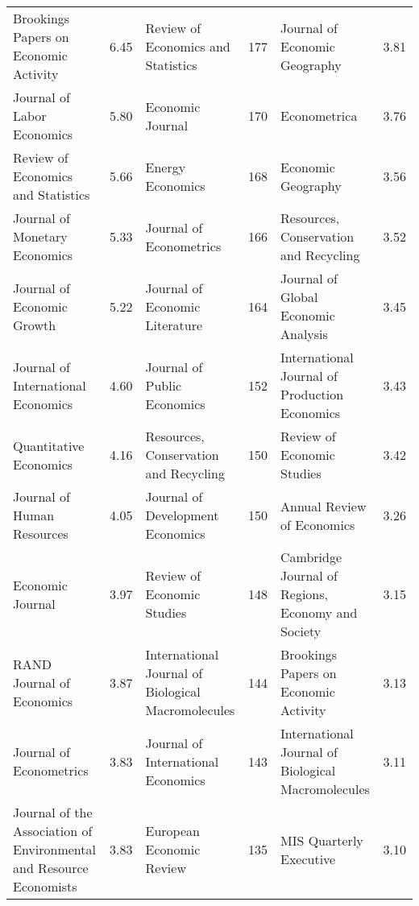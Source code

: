 \begin{table}
\begin{tabularx}{\hsize}{@{}Yr|Yr|Yr@{}}
                              Brookings Papers on Economic Activity &  6.45 &                 Review of Economics and Statistics & 177 &                      Journal of Economic Geography & 3.81 \\
                                         Journal of Labor Economics &  5.80 &                                   Economic Journal & 170 &                                       Econometrica & 3.76 \\
                                 Review of Economics and Statistics &  5.66 &                                   Energy Economics & 168 &                                 Economic Geography & 3.56 \\
                                      Journal of Monetary Economics &  5.33 &                            Journal of Econometrics & 166 &              Resources, Conservation and Recycling & 3.52 \\
                                         Journal of Economic Growth &  5.22 &                     Journal of Economic Literature & 164 &                Journal of Global Economic Analysis & 3.45 \\
                                 Journal of International Economics &  4.60 &                        Journal of Public Economics & 152 &      International Journal of Production Economics & 3.43 \\
                                             Quantitative Economics &  4.16 &              Resources, Conservation and Recycling & 150 &                         Review of Economic Studies & 3.42 \\
                                         Journal of Human Resources &  4.05 &                   Journal of Development Economics & 150 &                         Annual Review of Economics & 3.26 \\
                                                   Economic Journal &  3.97 &                         Review of Economic Studies & 148 &  Cambridge Journal of Regions, Economy and Society & 3.15 \\
                                          RAND Journal of Economics &  3.87 & International Journal of Biological Macromolecules & 144 &              Brookings Papers on Economic Activity & 3.13 \\
                                            Journal of Econometrics &  3.83 &                 Journal of International Economics & 143 & International Journal of Biological Macromolecules & 3.11 \\
Journal of the Association of Environmental and Resource Economists &  3.83 &                           European Economic Review & 135 &                            MIS Quarterly Executive & 3.10 \\
\bottomrule
\end{tabularx}
\end{table}
